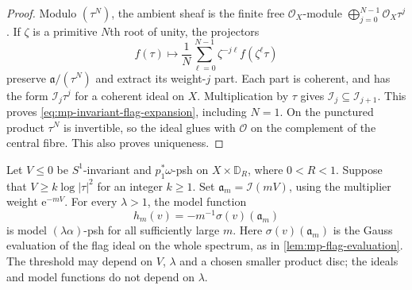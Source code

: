 \begin{proof}
Modulo $(\tau^N)$, the ambient sheaf is the finite free $\mathcal O_X$-module $\bigoplus_{j=0}^{N-1}\mathcal O_X\tau^j$. If $\zeta$ is a primitive $N$th root of unity, the projectors
\[
 f(\tau)\longmapsto\frac1N\sum_{\ell=0}^{N-1}
                          \zeta^{-j\ell}f(\zeta^\ell\tau)
\]
preserve $\mathfrak a/(\tau^N)$ and extract its weight-$j$ part. Each part is coherent, and has the form $\mathcal I_j\tau^j$ for a coherent ideal on $X$. Multiplication by $\tau$ gives $\mathcal I_j\subseteq\mathcal I_{j+1}$. This proves \eqref{eq:mp-invariant-flag-expansion}, including $N=1$. On the punctured product $\tau^N$ is invertible, so the ideal glues with $\mathcal O$ on the complement of the central fibre. This also proves uniqueness.
\end{proof}

\begin{lemma}\label{lem:mp-regularized-flag-nef}
Let $V\leq0$ be $S^1$-invariant and $p_1^*\omega$-psh on $X\times\mathbb D_R$, where $0<R<1$. Suppose that $V\geq k\log|\tau|^2$ for an integer $k\geq1$. Set $\mathfrak a_m=\mathcal I(mV)$, using the multiplier weight $\mathrm e^{-mV}$. For every $\lambda>1$, the model function
\[
                    h_m(v)=-m^{-1}\sigma(v)(\mathfrak a_m)
\]
is model $(\lambda\alpha)$-psh for all sufficiently large $m$. Here $\sigma(v)(\mathfrak a_m)$ is the Gauss evaluation of the flag ideal on the whole spectrum, as in \cref{lem:mp-flag-evaluation}. The threshold may depend on $V$, $\lambda$ and a chosen smaller product disc; the ideals and model functions do not depend on $\lambda$.
\end{lemma}

